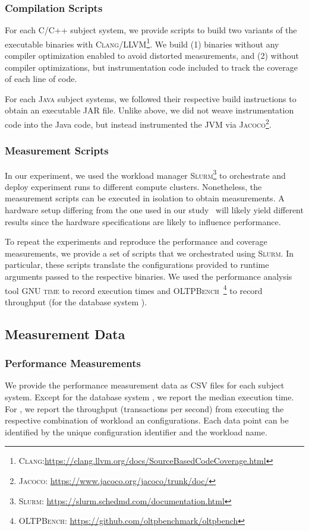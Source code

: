 {%
\subsubsection{Compilation Scripts} For each \textsc{C/C++} subject system, we provide scripts to build two variants of the executable binaries with \textsc{Clang/LLVM}\footnote{\textsc{Clang}:\url{https://clang.llvm.org/docs/SourceBasedCodeCoverage.html}}. We build (1) binaries without any compiler optimization enabled to avoid distorted measurements, and (2) without compiler optimizations, but instrumentation code included to track the coverage of each line of code. 

For each \textsc{Java} subject systems, we followed their respective build instructions to obtain an executable JAR file. Unlike above, we did not weave instrumentation code into the Java code, but instead instrumented the JVM via \textsc{Jacoco}\footnote{\textsc{Jacoco}: \url{https://www.jacoco.org/jacoco/trunk/doc/}}.

\subsubsection{Measurement Scripts} In our experiment, we used the workload manager \textsc{Slurm}\footnote{\textsc{Slurm}: \url{https://slurm.schedmd.com/documentation.html}} to orchestrate and deploy experiment runs to different compute clusters. Nonetheless, the measurement scripts can be executed in isolation to obtain measurements. A hardware setup differing from the one used in our study~\cite{muhlbauer_workload_2023} will likely yield different results since the hardware specifications are likely to influence performance. 

To repeat the experiments and reproduce the performance and coverage measurements, we provide a set of scripts that we orchestrated using \textsc{Slurm}. In particular, these scripts translate the configurations provided to runtime arguments passed to the respective binaries. We used the performance analysis tool \textsc{GNU time} to record execution times and \textsc{OLTPBench}~\footnote{\textsc{OLTPBench}: \url{https://github.com/oltpbenchmark/oltpbench}} to record throughput (for the database system \htwo).


\subsection{Measurement Data}
\subsubsection{Performance Measurements} 
We provide the performance measurement data as CSV files for each subject system. Except for the database system \htwo, we report the median execution time. For \htwo, we report the throughput (transactions per second) from executing the respective combination of workload an configurations. Each data point can be identified by the unique configuration identifier and the workload name.

}
